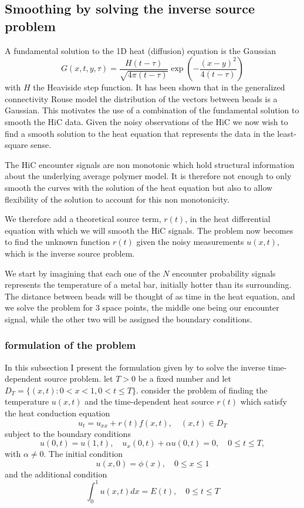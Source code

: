 \documentclass[12pt]{article}
\begin{document}
\subsection{Smoothing by solving the inverse source problem}\label{subsection_SmoothingbyInverseHeat}
A fundamental solution to the 1D heat (diffusion) equation is the Gaussian
\begin{equation*}
G(x,t,y,\tau) =\frac{H(t-\tau)}{\sqrt{4\pi (t-\tau)}}\exp\left(-\frac{(x-y)^2}{4(t-\tau)}\right)
\end{equation*}
with $H$ the Heaviside step function. It has been shown that in the generalized connectivity Rouse model the distribution of the vectors between beads is a Gaussian. This motivates the use of a combination of the fundamental solution to smooth the HiC data. Given the noisy observations of the HiC we now wish to find a smooth solution to the heat equation that represents the data in the least-square sense. 

The HiC encounter signals are non monotonic which hold structural information about the underlying average polymer model. It is therefore not enough to only smooth the curves with the solution of the heat equation but also to allow flexibility of the solution to account for this non monotonicity. 

We therefore add a theoretical source term, $r(t)$, in the heat differential equation with which we will smooth the HiC signals. The problem now becomes to find the unknown function $r(t)$ given the noisy measurements $u(x,t)$, which is the inverse source problem.

We start by imagining that each one of the $N$ encounter probability signals represents the temperature of a metal bar, initially hotter than its surrounding. The distance between beads will be thought of as time in the heat equation, and we solve the problem for 3 space points, the middle one being our encounter signal, while the other two will be assigned the boundary conditions.
\subsubsection{formulation of the problem}
In this subsection I present the formulation given by \cite{hazanee2013inverse} to solve the inverse time-dependent source problem.
let $T>0$ be a fixed number and let $D_T=\{(x,t): 0<x<1,0<t\leq T \}$. consider the problem of finding the temperature $u(x,t)$ and the time-dependent heat source $r(t)$ which satisfy the heat conduction equation 
\begin{equation*}
u_t = u_{xx}+r(t)f(x,t),\quad (x,t)\in D_T
\end{equation*}
subject to the boundary conditions 
\begin{equation*}
u(0,t)=u(1,t), \quad u_x(0,t)+\alpha u(0,t)=0,\quad 0\leq t\leq T,
\end{equation*}
with $\alpha \neq 0$. The initial condition 
\begin{equation*}
u(x,0) = \phi (x),\quad 0\leq x\leq 1
\end{equation*}
and the additional condition 
\begin{equation*}
\int_0^1 u(x,t)dx = E(t),\quad 0\leq t\leq T
\end{equation*}
\end{document}
